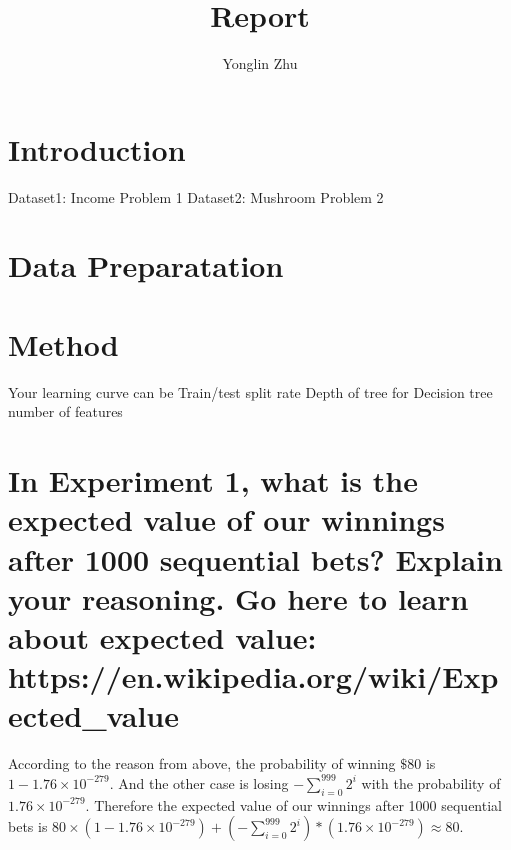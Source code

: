 \documentclass{svproc}
\begin{document}
\mainmatter              %
%

\title{Report}
%
%
\author{Yonglin Zhu }
%
%

\maketitle              %
\section{Introduction}
Dataset1: Income
Problem 1 
Dataset2: Mushroom
Problem 2
\section{Data Preparatation}
\section{Method}
Your learning curve can be 
Train/test split rate
Depth of tree for Decision tree
number of features

\label{sec1}

\label{sec1}
\section{In Experiment 1, what is the expected value of our winnings after 1000 sequential bets? Explain your reasoning. Go here to learn about expected value: https://en.wikipedia.org/wiki/Expected\_value}\label{sec2}
According to the reason from above, the probability of winning $\$80$ is $1-1.76\times10^{-279}$. 
And the other case is losing $- \sum_{i=0}^{999} 2^i$ with the probability of $1.76\times10^{-279}$. 
Therefore the expected value of our winnings after 1000 sequential bets is $80\times(1-1.76\times10^{-279})+(- \sum_{i=0}^{999} 2^i)*(1.76\times10^{-279}) \approx 80$.
\end{document}
